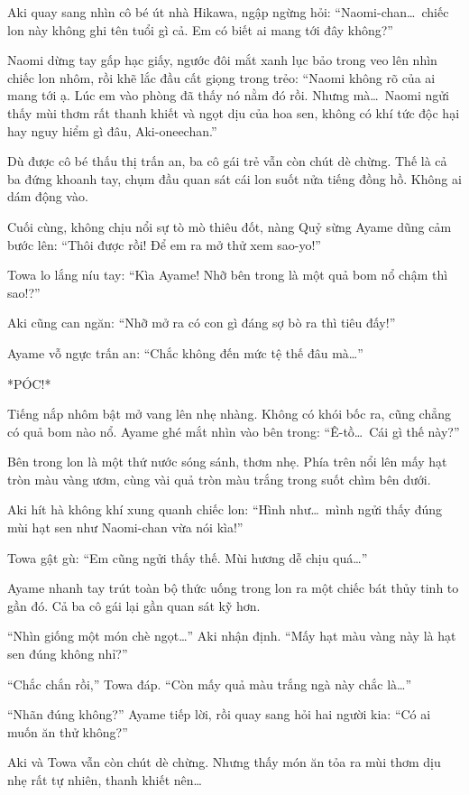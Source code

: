 \documentclass[../main.tex]{subfiles}
\begin{document}
Aki quay sang nhìn cô bé út nhà Hikawa, ngập ngừng hỏi: ``Naomi-chan\dots\ chiếc lon này không ghi tên tuổi gì cả. Em có biết ai mang tới đây không?''

Naomi dừng tay gấp hạc giấy, ngước đôi mắt xanh lục bảo trong veo lên nhìn chiếc lon nhôm, rồi khẽ lắc đầu cất giọng trong trẻo: ``Naomi không rõ của ai mang tới ạ. Lúc em vào phòng đã thấy nó nằm đó rồi. Nhưng mà\dots\ Naomi ngửi thấy mùi thơm rất thanh khiết và ngọt dịu của hoa sen, không có khí tức độc hại hay nguy hiểm gì đâu, Aki-oneechan.''

Dù được cô bé thấu thị trấn an, ba cô gái trẻ vẫn còn chút dè chừng. Thế là cả ba đứng khoanh tay, chụm đầu quan sát cái lon suốt nửa tiếng đồng hồ. Không ai dám động vào.

Cuối cùng, không chịu nổi sự tò mò thiêu đốt, nàng Quỷ sừng Ayame dũng cảm bước lên: ``Thôi được rồi! Để em ra mở thử xem sao-yo!''

Towa lo lắng níu tay: ``Kìa Ayame! Nhỡ bên trong là một quả bom nổ chậm thì sao!?''

Aki cũng can ngăn: ``Nhỡ mở ra có con gì đáng sợ bò ra thì tiêu đấy!''

Ayame vỗ ngực trấn an: ``Chắc không đến mức tệ thế đâu mà\dots''

*PÓC!*

Tiếng nắp nhôm bật mở vang lên nhẹ nhàng. Không có khói bốc ra, cũng chẳng có quả bom nào nổ. Ayame ghé mắt nhìn vào bên trong: ``Ê-tồ\dots\ Cái gì thế này?''

Bên trong lon là một thứ nước sóng sánh, thơm nhẹ. Phía trên nổi lên mấy hạt tròn màu vàng ươm, cùng vài quả tròn màu trắng trong suốt chìm bên dưới.

Aki hít hà không khí xung quanh chiếc lon: ``Hình như\dots\ mình ngửi thấy đúng mùi hạt sen như Naomi-chan vừa nói kìa!''

Towa gật gù: ``Em cũng ngửi thấy thế. Mùi hương dễ chịu quá\dots''

Ayame nhanh tay trút toàn bộ thức uống trong lon ra một chiếc bát thủy tinh to gần đó. Cả ba cô gái lại gần quan sát kỹ hơn.

``Nhìn giống một món chè ngọt\dots'' Aki nhận định. ``Mấy hạt màu vàng này là hạt sen đúng không nhỉ?''

``Chắc chắn rồi,'' Towa đáp. ``Còn mấy quả màu trắng ngà này chắc là\dots''

``Nhãn đúng không?'' Ayame tiếp lời, rồi quay sang hỏi hai người kia: ``Có ai muốn ăn thử không?''

Aki và Towa vẫn còn chút dè chừng. Nhưng thấy món ăn tỏa ra mùi thơm dịu nhẹ rất tự nhiên, thanh khiết nên\dots
\end{document}
